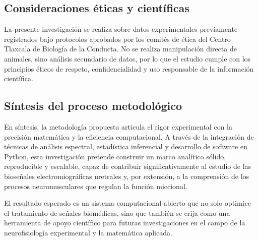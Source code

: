 \subsection{Consideraciones éticas y científicas}

La presente investigación se realiza sobre datos experimentales previamente registrados bajo protocolos aprobados por los comités de ética del Centro Tlaxcala de Biología de la Conducta. No se realiza manipulación directa de animales, sino análisis secundario de datos, por lo que el estudio cumple con los principios éticos de respeto, confidencialidad y uso responsable de la información científica.

\subsection{Síntesis del proceso metodológico}

En síntesis, la metodología propuesta articula el rigor experimental con la precisión matemática y la eficiencia computacional. A través de la integración de técnicas de análisis espectral, estadística inferencial y desarrollo de software en Python, esta investigación pretende construir un marco analítico sólido, reproducible y escalable, capaz de contribuir significativamente al estudio de las bioseñales electromiográficas uretrales y, por extensión, a la comprensión de los procesos neuromusculares que regulan la función miccional.

El resultado esperado es un sistema computacional abierto que no solo optimice el tratamiento de señales biomédicas, sino que también se erija como una herramienta de apoyo científico para futuras investigaciones en el campo de la neurofisiología experimental y la matemática aplicada.




